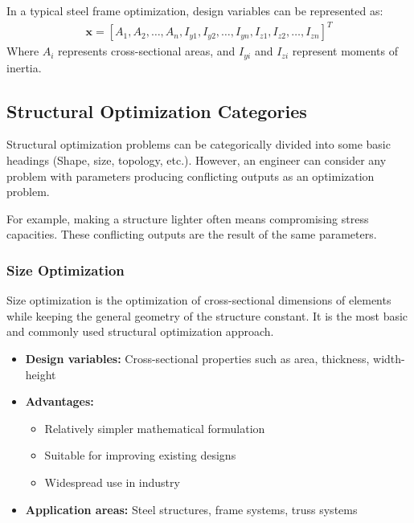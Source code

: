 \begin{tcolorbox}[title=Design Variables Representation]
In a typical steel frame optimization, design variables can be represented as:
\begin{align}
\mathbf{x} = [A_1, A_2, \ldots, A_n, I_{y1}, I_{y2}, \ldots, I_{yn}, I_{z1}, I_{z2}, \ldots, I_{zn}]^T
\end{align}
Where $A_i$ represents cross-sectional areas, and $I_{yi}$ and $I_{zi}$ represent moments of inertia.
\end{tcolorbox}

\subsection{Structural Optimization Categories}

Structural optimization problems can be categorically divided into some basic headings (Shape, size, topology, etc.). However, an engineer can consider any problem with parameters producing conflicting outputs as an optimization problem.

For example, making a structure lighter often means compromising stress capacities. These conflicting outputs are the result of the same parameters.

\subsubsection{Size Optimization}
Size optimization is the optimization of cross-sectional dimensions of elements while keeping the general geometry of the structure constant. It is the most basic and commonly used structural optimization approach.

\begin{itemize}
    \item \textbf{Design variables:} Cross-sectional properties such as area, thickness, width-height
    \item \textbf{Advantages:} 
    \begin{itemize}
        \item Relatively simpler mathematical formulation
        \item Suitable for improving existing designs
        \item Widespread use in industry
    \end{itemize}
    \item \textbf{Application areas:} Steel structures, frame systems, truss systems
\end{itemize}

